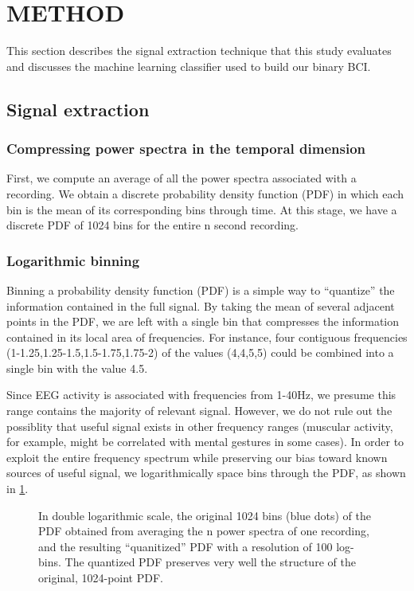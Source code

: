 \section{\uppercase{Method}}

This section describes the signal extraction technique that this study evaluates and discusses the machine learning classifier used to build our binary BCI.

\subsection{Signal extraction}

\subsubsection{Compressing power spectra in the temporal dimension}

First, we compute an average of all the power spectra associated with a recording. We obtain a discrete probability density function (PDF) in which each bin is the mean of its corresponding bins through time. At this stage, we have a discrete PDF of 1024 bins for the entire n second recording. 

\subsubsection{Logarithmic binning}

Binning a probability density function (PDF) is a simple way to ``quantize'' the information contained in the full signal. By taking the mean of several adjacent points in the PDF, we are left with a single bin that compresses the information contained in its local area of frequencies. For instance, four contiguous frequencies (1-1.25,1.25-1.5,1.5-1.75,1.75-2) of the values (4,4,5,5) could be combined into a single bin with the value 4.5. 

Since EEG activity is associated with frequencies from 1-40Hz, we presume this range contains the majority of relevant signal. However, we do not rule out the possiblity that useful signal exists in other frequency ranges (muscular activity, for example, might be correlated with mental gestures in some cases). In order to exploit the entire frequency spectrum while preserving our bias toward known sources of useful signal, we logarithmically space bins through the PDF, as shown in \ref{binnedEEGpowerspec}.

\begin{figure}[!h]
  \vspace{-0.2cm}
  {}
\caption{In double logarithmic scale, the original 1024 bins (blue dots) of the PDF obtained from averaging the n power spectra of one recording, and the resulting ``quanitized''  PDF with a resolution of 100 log-bins. The quantized PDF preserves very well the structure of the original, 1024-point PDF. }
\label{binnedEEGpowerspec}
\vspace{-0.1cm}
\end{figure}


